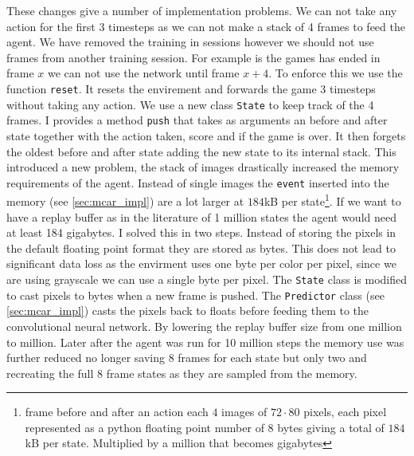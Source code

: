 These changes give a number of implementation problems. We can not take any action for the first 3 timesteps as we can not make a stack of 4 frames to feed the agent. We have removed the training in sessions however we should not use frames from another training session. For example is the games has ended in frame $x$ we can not use the network until frame $x+4$. To enforce this we use the function \texttt{reset}. It resets the envirement and forwards the game 3 timesteps without taking any action. We use a new class \texttt{State} to keep track of the 4 frames. I provides a method \texttt{push} that takes as arguments an before and after state together with the action taken, score and if the game is over. It then forgets the oldest before and after state adding the new state to its internal stack.
This introduced a new problem, the stack of images drastically increased the memory requirements of the agent. Instead of single images the \texttt{event} inserted into the memory (see \autoref{sec:mcar_impl}) are a lot larger at $184$kB per state\footnote{frame before and after an action each $4$ images of $72\cdot80$ pixels, each pixel represented as a python floating point number of $8$ bytes giving a total of $184$kB per state. Multiplied by a million that becomes gigabytes}. If we want to have a replay buffer as in the literature\cite{DQN} of 1 million states the agent would need at least 184 gigabytes. I solved this in two steps. Instead of storing the pixels in the default floating point format they are stored as bytes. This does not lead to significant data loss as the envirment uses one byte per color per pixel, since we are using grayscale we can use a single byte per pixel. The \texttt{State} class is modified to cast pixels to bytes when a new frame is pushed. The \texttt{Predictor} class (see \autoref{sec:mcar_impl}) casts the pixels back to floats before feeding them to the convolutional neural network. By lowering the replay buffer size from one million to  million. Later after the agent was run for 10 million steps the memory use was further reduced no longer saving 8 frames for each state but only two and recreating the full 8 frame states as they are sampled from the memory.